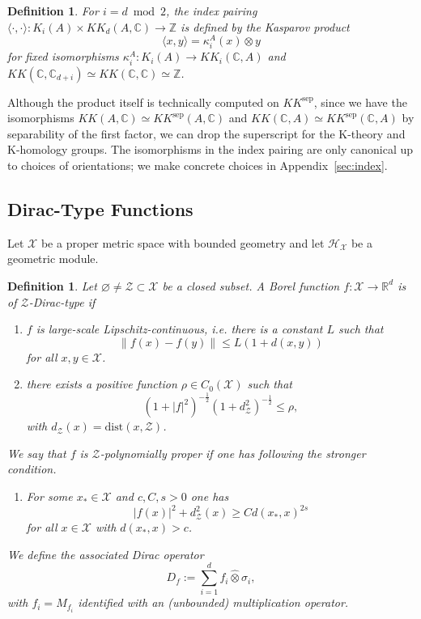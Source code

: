 \documentclass[12pt]{amsart}
\newtheorem{definition}[theorem]{Definition}
\newcommand{\CM}{{\mathbb C}}
\newcommand{\RM}{{\mathbb R}}
\newcommand{\ZM}{{\mathbb Z}}
\newcommand{\Hh}{{\mathcal H}}
\newcommand{\Xx}{{\mathcal X}}
\newcommand{\Zz}{{\mathcal Z}}
\providecommand{\abs}[1]{\left \lvert#1 \right \rvert}
\providecommand{\norm}[1]{\left \lVert#1 \right \rVert}
\begin{document}
\begin{definition}
\label{def:index}
For $i=d\bmod 2$, the index pairing $\langle \cdot , \cdot\rangle: K_{i}(A)\times KK_d(A , \CM) \to \ZM $ is defined by the Kasparov product
\[\langle x, y \rangle = \kappa_i^A(x) \otimes y\]
for fixed isomorphisms $\kappa_i^A: K_{i}(A)\to KK_i(\CM, A)$ and $KK(\CM,\CM_{d+i})\simeq KK(\CM,\CM)\simeq \ZM$.
\end{definition}
Although the product itself is technically computed on $KK^{\mathrm{sep}}$, since we have the isomorphisms $KK(A,\CM)\simeq KK^{\mathrm{sep}}(A,\CM)$ \cite{Skandalis1985ExtensionsSemifiniteFactor} and $KK(\CM, A)\simeq KK^{\mathrm{sep}}(\CM, A)$ by separability of the first factor, we can drop the superscript for the K-theory and K-homology groups. 
The isomorphisms in the index pairing are only canonical up to choices of orientations; we make concrete choices in Appendix~\ref{sec:index}.

\subsection{Dirac-Type Functions}
\label{sec:dirac_ops}
Let $\Xx$ be a proper metric space with bounded geometry and let $\Hh_\Xx$ be a geometric module.
\begin{definition}
\label{def:edge_dirac_type}
Let $\varnothing \neq \Zz\subset \Xx$ be a closed subset.
A Borel function $f:\Xx \to \RM^d$ is of $\Zz$-Dirac-type if 
\begin{enumerate}
   \item[(i)] $f$ is large-scale Lipschitz-continuous, i.e. there is a constant $L$ such that
   \[\norm{f(x)-f(y)}\leq L(1+ d(x,y))\]
   for all $x,y \in \Xx$.
    \item[(ii)] there exists a positive function $\rho\in C_0(\Xx)$ such that \[(1+\abs{f}^2)^{-\frac{1}{2}} (1+ d_\Zz^2)^{-\frac12} \leq  \rho,\]
    with $d_\Zz(x)=\mathrm{dist}(x, \Zz)$.
\end{enumerate}
We say that $f$ is $\Zz$-polynomially proper if one has following the stronger condition.
\begin{enumerate}
    \item[(ii')] For some $x_*\in \Xx$ and $c,C,s>0$ one has $$|f(x)|^2 + d^2_\Zz(x) \geq  C d(x_*,  x)^{2s}$$
for all $x\in \Xx$ with $d(x_*,x)>c$.
\end{enumerate}
We define the associated Dirac operator \[D_f:= \sum_{i=1}^d f_i\hat{\otimes} \sigma_i,\]
with $f_i = M_{f_i}$ identified with an (unbounded) multiplication operator.

\end{definition}
\end{document}
